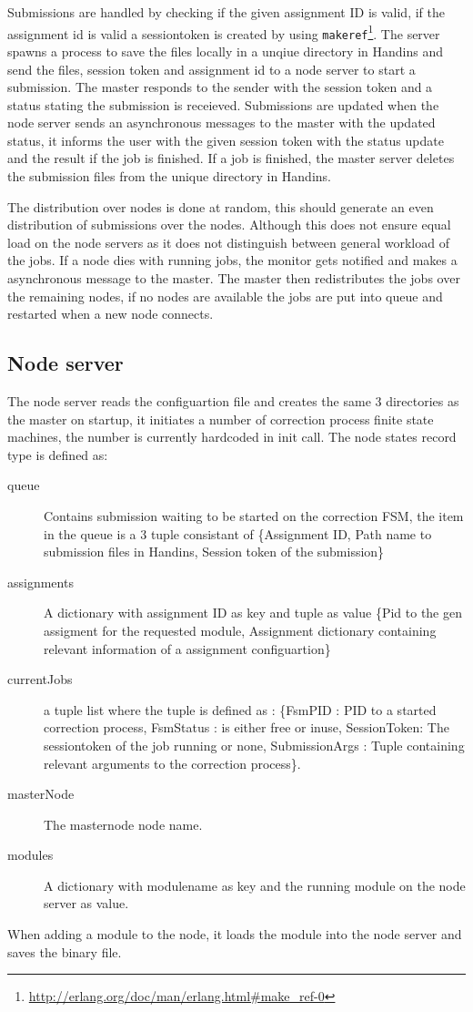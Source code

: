 Submissions are handled by checking if the given assignment ID is valid, if the assignment id is valid a sessiontoken is created by using \texttt{makeref}\footnote{\url{http://erlang.org/doc/man/erlang.html\#make_ref-0}}. The server spawns a process to save the files locally in a unqiue directory in Handins and send the files, session token and assignment id to a node server to start a submission. The master responds to the sender with the session token and a status stating the submission is receieved. Submissions are updated when the node server sends an asynchronous messages to the master with the updated status, it informs the user with the given session token with the status update and the result if the job is finished. If a job is finished, the master server deletes the submission files from the unique directory in Handins.

The distribution over nodes is done at random, this should generate an even distribution of submissions over the nodes. Although this does not ensure equal load on the node servers as it does not distinguish between general workload of the jobs. If a node dies with running jobs, the monitor gets notified and makes a asynchronous message to the master. The master then redistributes the jobs over the remaining nodes, if no nodes are available the jobs are put into queue and restarted when a new node connects.
\subsection{Node server}
The node server reads the configuartion file and creates the same 3 directories as the master on startup, it initiates a number of correction process finite state machines, the number is currently hardcoded in init call. The node states record type is defined as:
\begin{description}
     \item [queue] Contains submission waiting to be started on the correction FSM, the item in the queue is a 3 tuple consistant of \{Assignment ID, Path name to submission files in Handins, Session token of the submission\}
     \item [assignments] A dictionary with assignment ID as key and tuple as value \{Pid to the gen assigment for the requested module, Assignment dictionary containing relevant information of a assignment configuartion\}
     \item [currentJobs] a tuple list where the tuple is defined as : \{FsmPID : PID to a started correction process, FsmStatus : is either free or inuse, SessionToken: The sessiontoken of the job running or none, SubmissionArgs : Tuple containing relevant arguments to the correction process\}.
     \item [masterNode] The masternode node name.
     \item [modules]  A dictionary with modulename as key and the running module on the node server as value.
 \end{description}
When adding a module to the node, it loads the module into the node server and saves the binary file.

